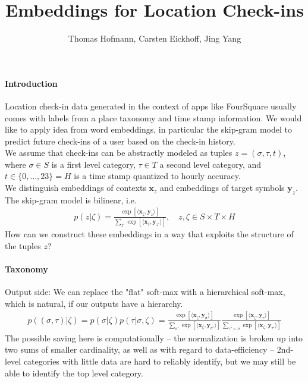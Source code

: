 \documentclass{article}
\author{Thomas Hofmann, Carsten Eickhoff, Jing Yang}
\title{Embeddings for Location Check-ins}
\newcommand{\x}{{\mathbf x}}
\newcommand{\y}{{\mathbf y}}
\begin{document}
\maketitle

\paragraph{Introduction} 

Location check-in data generated in the context of apps like FourSquare usually comes with labels from a place taxonomy and time stamp information. We would like to apply idea from word embeddings, in particular the skip-gram model to predict future check-ins of a user based on the check-in history. \\

We assume that check-ins can be abstractly modeled as tuples $z=(\sigma, \tau, t)$, where $\sigma \in S$ is a first level category, $\tau \in T$ a second level category, and $t \in \{ 0,\dots,23\} = H$ is a time stamp quantized to hourly accuracy.  \\

We distinguish embeddings of contexts $\x_z$ and embeddings of target symbols $\y_z$. The skip-gram model is bilinear, i.e.~
\begin{align}
p(z|\zeta) = \frac{\exp[\langle \x_{\zeta}, \y_{z} \rangle] }{\sum_{z'} \exp[\langle \x_{\zeta}, \y_{z'} \rangle]}, \quad z,\zeta \in S \times T \times H
\end{align} 
How can we construct these  embeddings in a way that exploits the structure of the tuples $z$?

\paragraph{Taxonomy} 

Output side: We can replace the "flat" soft-max with a hierarchical soft-max, which is natural, if our outputs have a hierarchy. 
\begin{align}
p((\sigma,\tau)|\zeta) = p(\sigma | \zeta) p(\tau | \sigma, \zeta)  = 
\frac{\exp[\langle \x_{\zeta}, \y_{\sigma} \rangle] }{\sum_{\sigma'} \exp[\langle \x_{\zeta}, \y_{\sigma'} \rangle]} 
\frac{\exp[\langle \x_{\zeta}, \y_{\tau} \rangle] }{\sum_{\tau' \succ \sigma} \exp[\langle \x_{\zeta}, \y_{\tau'} \rangle]} 
\end{align} 
The possible saving here is computationally -- the normalization is broken up into two sums of smaller cardinality, as well as with regard to data-efficiency -- 2nd-level categories with little data are hard to reliably identify, but we may still be able to identify the top level category. \\
\end{document}
